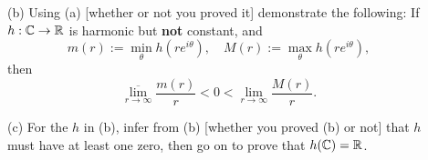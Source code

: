 \documentclass{article}
\begin{document}
\begin{description}
\item[\quad] (b)
Using (a) [whether or not you proved it] demonstrate the following: If
$h : \Bbb C \to \Bbb R$ is harmonic but {\bf not} constant, and
$$m(r) := \min_{\theta} h(re^{i \theta}), \quad
  M(r) := \max_\theta h (re^{i \theta}),$$
then
$$\overline{\lim_{r \to \infty}} \frac{m(r)}{r} < 0 < \lim_{r \to \infty}
  \frac{M(r)}{r}.$$

\item[\quad] (c)
For the $h$ in (b), infer from (b) [whether you proved (b) or not] that
$h$ must have at least one zero, then go on to prove that $h(\Bbb C) = \Bbb R$.





\end{description}    
\end{document}
